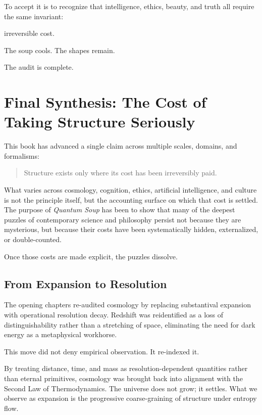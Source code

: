 \documentclass[11pt]{book}
\begin{document}
To accept it is to recognize that intelligence, ethics, beauty, and truth all
require the same invariant:

irreversible cost.

The soup cools.
The shapes remain.

The audit is complete.


\chapter*{Final Synthesis: The Cost of Taking Structure Seriously}

This book has advanced a single claim across multiple scales, domains, and
formalisms:

\begin{quote}
Structure exists only where its cost has been irreversibly paid.
\end{quote}

What varies across cosmology, cognition, ethics, artificial intelligence, and
culture is not the principle itself, but the accounting surface on which that
cost is settled. The purpose of \emph{Quantum Soup} has been to show that many of
the deepest puzzles of contemporary science and philosophy persist not because
they are mysterious, but because their costs have been systematically hidden,
externalized, or double-counted.

Once those costs are made explicit, the puzzles dissolve.

\section{From Expansion to Resolution}

The opening chapters re-audited cosmology by replacing substantival expansion
with operational resolution decay. Redshift was reidentified as a loss of
distinguishability rather than a stretching of space, eliminating the need for
dark energy as a metaphysical workhorse.

This move did not deny empirical observation. It re-indexed it.

By treating distance, time, and mass as resolution-dependent quantities rather
than eternal primitives, cosmology was brought back into alignment with the
Second Law of Thermodynamics. The universe does not grow; it settles. What we
observe as expansion is the progressive coarse-graining of structure under
entropy flow.
\end{document}
